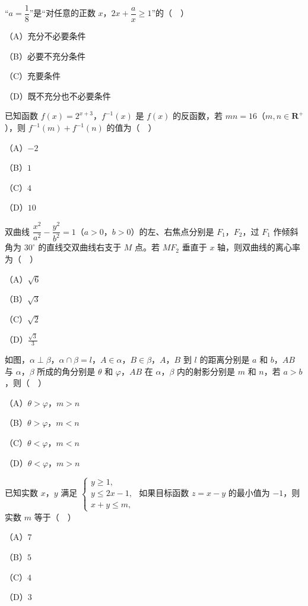 \begin{question}
“$a=\dfrac18$”是“对任意的正数 $x$，$2x+\dfrac ax\geqslant1$”的（　）

（A）充分不必要条件

（B）必要不充分条件

（C）充要条件

（D）既不充分也不必要条件

\end{question}
\begin{question}
已知函数 $f(x)=2^{x+3}$，$f^{-1}(x)$ 是 $f(x)$ 的反函数，若 $mn=16$（$m,n\in\mathbf R^+$），则 $f^{-1}(m)+f^{-1}(n)$ 的值为（　）

（A）$-2$

（B）$1$

（C）$4$

（D）$10$

\end{question}
\begin{question}
双曲线 $\dfrac{x^2}{a^2}-\dfrac{y^2}{b^2}=1$（$a>0$，$b>0$）的左、右焦点分别是 $F_1$，$F_2$，过 $F_1$ 作倾斜角为 $30^\circ$ 的直线交双曲线右支于 $M$ 点。若 $MF_2$ 垂直于 $x$ 轴，则双曲线的离心率为（　）

（A）$\sqrt6$

（B）$\sqrt3$

（C）$\sqrt2$

（D）$\frac{\sqrt3}3$

\Needspace{0.4\textheight}
\end{question}
\begin{question}
如图，$\alpha\perp\beta$，$\alpha\cap\beta=l$，$A\in\alpha$，$B\in\beta$，$A$，$B$ 到 $l$ 的距离分别是 $a$ 和 $b$，$AB$ 与 $\alpha$，$\beta$ 所成的角分别是 $\theta$ 和 $\varphi$，$AB$ 在 $\alpha$，$\beta$ 内的射影分别是 $m$ 和 $n$，若 $a>b$，则（　）
\nopagebreak[4]
\begin{center}\end{center}
\nopagebreak[4]
（A）$\theta>\varphi$，$m>n$

（B）$\theta>\varphi$，$m<n$

（C）$\theta<\varphi$，$m<n$

（D）$\theta<\varphi$，$m>n$

\end{question}
\begin{question}
已知实数 $x$，$y$ 满足 $\begin{cases}y\geqslant1,\\ y\leqslant2x-1,\\ x+y\leqslant m,\end{cases}$ 如果目标函数 $z=x-y$ 的最小值为 $-1$，则实数 $m$ 等于（　）

（A）$7$

（B）$5$

（C）$4$

（D）$3$

\end{question}
